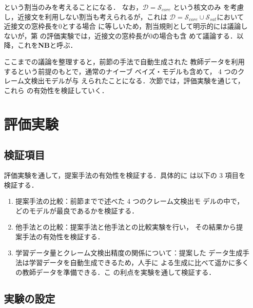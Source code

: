 \documentclass[japanese]{jnlp_1.4}
\def\sec#1{}
\begin{document}
という割当のみを考えることになる．
なお，$\mathcal{D} = \mathcal{S}_{core}$ という核文のみ
を考慮し，近接文を利用しない割当も考えられるが，これは
$\mathcal{D} = \mathcal{S}_{core} \cup
\mathcal{S}_{sat}$において近接文の窓枠長を$0$とする場合
に等しいため，割当規則として明示的には議論しないが，第
\sec{exp}の評価実験では，近接文の窓枠長が$0$の場合も含
めて議論する．以降，これを\textbf{NB}と呼ぶ．

ここまでの議論を整理すると，前節の手法で自動生成された
教師データを利用するという前提のもとで，通常のナイーブ
ベイズ・モデルも含めて， 4 つのクレーム文検出モデルが与
えられたことになる．次節では，評価実験を通じて，これら
の有効性を検証していく．




\section{評価実験}
\label{sec:exp}


\subsection{検証項目}

評価実験を通して，提案手法の有効性を検証する．具体的に
は以下の 3 項目を検証する．
\begin{enumerate}
 \item 
提案手法の比較：前節までで述べた 4 つのクレーム文検出モ
デルの中で，どのモデルが最良であるかを検証する．

 \item 
他手法との比較：提案手法と他手法との比較実験を行い，
その結果から提案手法の有効性を検証する．

 \item 
学習データ量とクレーム文検出精度の関係について：提案した
データ生成手法は学習データを自動生成できるため，人手に
よる生成に比べて遥かに多くの教師データを準備できる．こ
の利点を実験を通して検証する．

\end{enumerate}



\subsection{実験の設定}
\label{sec:setting}
\end{document}
